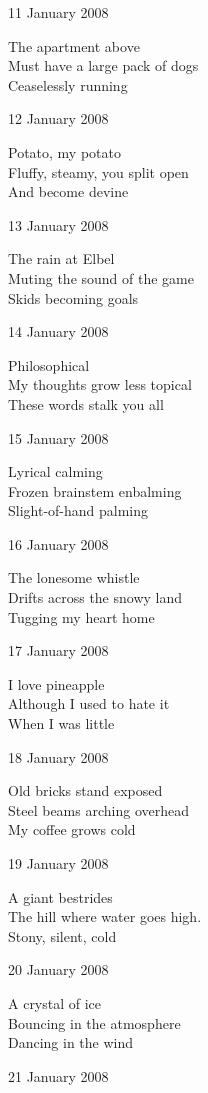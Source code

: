 \documentclass[12pt]{article}
\begin{document}
11 January 2008

The apartment above \\
Must have a large pack of dogs \\
Ceaselessly running

12 January 2008

Potato, my potato \\
Fluffy, steamy, you split open \\
And become devine

13 January 2008

The rain at Elbel \\
Muting the sound of the game \\
Skids becoming goals

14 January 2008

Philosophical \\
My thoughts grow less topical \\
These words stalk you all

15 January 2008

Lyrical calming \\
Frozen brainstem enbalming \\
Slight-of-hand palming

16 January 2008

The lonesome whistle \\
Drifts across the snowy land \\
Tugging my heart home

17 January 2008

I love pineapple \\
Although I used to hate it \\
When I was little


\newpage

18 January 2008

Old bricks stand exposed \\
Steel beams arching overhead \\
My coffee grows cold

19 January 2008

A giant bestrides \\
The hill where water goes high. \\
Stony, silent, cold

20 January 2008

A crystal of ice \\
Bouncing in the atmosphere \\
Dancing in the wind

21 January 2008
\end{document}
